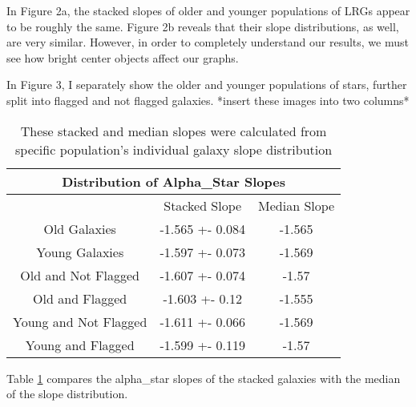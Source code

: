 \documentclass{article}
\begin{document}
In Figure 2a, the stacked slopes of older and younger populations of LRGs appear to be roughly the same. Figure 2b reveals that their slope distributions, as well, are very similar.  However, in order to completely understand our results, we must see how bright center objects affect our graphs.

In Figure 3, I separately show the older and younger populations of stars, further split into flagged and not flagged galaxies. *insert these images into two columns*

\begin{table}[h!]
\begin{tabular}{ |c|c|c|  }
\hline
\multicolumn{3}{|c|}{Distribution of Alpha\_Star Slopes}\\
\hline
   & Stacked Slope & Median Slope \\
\hline
Old Galaxies & -1.565 +- 0.084 &-1.565 \\
\hline
Young Galaxies &-1.597 +- 0.073 & -1.569\\
\hline
Old and Not Flagged & -1.607 +- 0.074 & -1.57\\
\hline
Old and Flagged & -1.603 +- 0.12 & -1.555\\
\hline
Young and Not Flagged & -1.611 +- 0.066 & -1.569\\
\hline
Young and Flagged & -1.599 +- 0.119 & -1.57\\
\hline
\end{tabular}
\caption{These stacked and median slopes were calculated from specific population's individual galaxy slope distribution}
\label{table:2}
\end{table}

Table \ref{table:2} compares the alpha\_star slopes of the stacked galaxies with the median of the slope distribution. 
\end{document}
